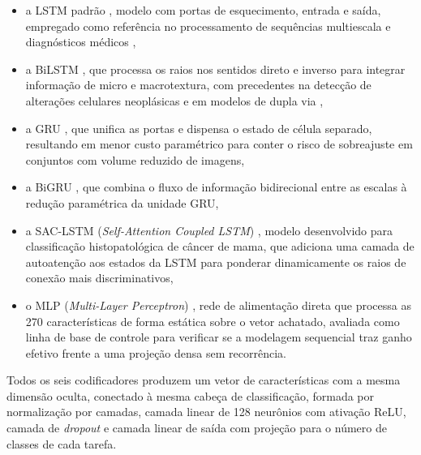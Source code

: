 \begin{itemize}
    \item a LSTM padrão \cite{hochreiter1997long,gers2000learning}, modelo com portas de esquecimento, entrada e saída, empregado como referência no processamento de sequências multiescala \cite{lin2022mslstm} e diagnósticos médicos \cite{mathiyalagi2026hclstm},
    \item a BiLSTM \cite{schuster1997bidirectional,graves2005framewise}, que processa os raios nos sentidos direto e inverso para integrar informação de micro e macrotextura, com precedentes na detecção de alterações celulares neoplásicas \cite{priyadarshini2026cnnbilstm} e em modelos de dupla via \cite{yousaf2024twostream},
    \item a GRU \cite{cho2014learning}, que unifica as portas e dispensa o estado de célula separado, resultando em menor custo paramétrico para conter o risco de sobreajuste em conjuntos com volume reduzido de imagens,
    \item a BiGRU \cite{schuster1997bidirectional,cho2014learning}, que combina o fluxo de informação bidirecional entre as escalas à redução paramétrica da unidade GRU,
    \item a SAC-LSTM (\textit{Self-Attention Coupled LSTM}) \cite{shalini2026saclstm}, modelo desenvolvido para classificação histopatológica de câncer de mama, que adiciona uma camada de autoatenção aos estados da LSTM para ponderar dinamicamente os raios de conexão mais discriminativos,
    \item o MLP (\textit{Multi-Layer Perceptron}) \cite{huang2022fusing}, rede de alimentação direta que processa as 270 características de forma estática sobre o vetor achatado, avaliada como linha de base de controle para verificar se a modelagem sequencial traz ganho efetivo frente a uma projeção densa sem recorrência.
\end{itemize}

Todos os seis codificadores produzem um vetor de características com a mesma dimensão oculta, conectado à mesma cabeça de classificação, formada por normalização por camadas, camada linear de 128 neurônios com ativação ReLU, camada de \textit{dropout} e camada linear de saída com projeção para o número de classes de cada tarefa.

